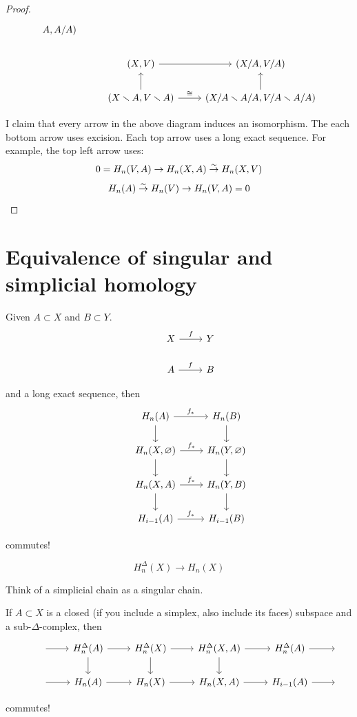 \documentclass[11pt,leqno,oneside]{amsart}
\numberwithin{thm}{section}
\newcommand{\minus}{\smallsetminus}
\renewcommand{\null}{\varnothing}
\newcommand{\homl}[1][n]{H_{#1}}
\newcommand{\dhoml}[1][n]{\homl^\Delta}
\begin{document}
\begin{proof}
$$\begin{tikzcd}
A, A/A) \\
    &(X, V) \arrow[r] &(X/A, V/A) \\
    &(X \minus A, V \minus A) \arrow[u] \arrow[r, "\isom"] &(X/A \minus A/A, V/A \minus A/A) \arrow[u]
  \end{tikzcd}$$

  I claim that every arrow in the above diagram induces an isomorphism.  The each bottom arrow uses excision.  Each top arrow uses a long exact sequence.  For example, the top left arrow uses:
  $$0 = \homl(V, A) \to \homl(X, A) \isomto \homl(X, V)$$
  $$\homl(A) \isomto \homl(V) \to \homl(V, A) = 0$$
\end{proof}

\section{Equivalence of singular and simplicial homology}

\begin{thm}
  Given $A \subset X$ and $B \subset Y$.
  $$\begin{tikzcd}
    &X \arrow[r, "f"] &Y \\
    &A \arrow[r, "f"] &B
  \end{tikzcd}$$

  and a long exact sequence, then
  $$\begin{tikzcd}
    &\homl(A) \arrow[d] \arrow[r, "f_*"] &\homl(B) \arrow[d] \\
    &\homl(X, \null) \arrow[d] \arrow[r, "f_*"] &\homl(Y, \null) \arrow[d] \\
    &\homl(X, A) \arrow[d] \arrow[r, "f_*"] &\homl(Y, B) \arrow[d] \\
    &\homl[i-1](A) \arrow[r, "f_*"] &\homl[i-1](B)
  \end{tikzcd}$$

  commutes!
\end{thm}

$$\dhoml(X) \to \homl(X)$$

Think of a simplicial chain as a singular chain.

\begin{thm}
  If $A \subset X$ is a closed (if you include a simplex, also include its faces) subspace and a sub-$\Delta$-complex, then
  $$\begin{tikzcd}
    &\, \arrow[r] &\dhoml(A) \arrow[d] \arrow[r] &\dhoml(X) \arrow[d] \arrow[r] &\dhoml(X, A) \arrow[d] \arrow[r] &\dhoml[i-1](A) \arrow[r] &\, \\
    &\, \arrow[r] &\homl(A) \arrow[r] &\homl(X) \arrow[r] &\homl(X, A) \arrow[r] &\homl[i-1](A) \arrow[r] &\,
  \end{tikzcd}$$

  commutes!
\end{thm}
\end{document}
